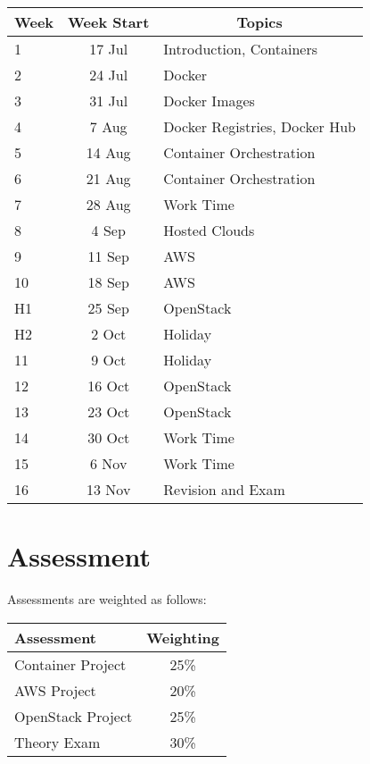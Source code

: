 \documentclass{article}
\begin{document}
\renewcommand{\arraystretch}{1.5}
\begin{tabular}{|l|c|l|}
\hline
 Week & Week Start & \multicolumn{1}{c|}{Topics}             \\ \hline
 1    & 17 Jul     & Introduction, Containers                 \\ \hline
 2    & 24 Jul     & Docker                                   \\ \hline
 3    &  31 Jul     & Docker Images                            \\ \hline
 4    & 7 Aug     & Docker Registries, Docker Hub            \\ \hline
 5    & 14 Aug     & Container Orchestration                  \\ \hline
 6    & 21 Aug     & Container Orchestration                 \\ \hline
 7    & 28 Aug     & Work Time                               \\ \hline
 8    &  4 Sep     & Hosted Clouds                            \\ \hline
 9    & 11 Sep     & AWS                                      \\ \hline
 10   & 18 Sep     & AWS                                      \\ \hline
 H1   & 25 Sep     & OpenStack                                  \\ \hline
 H2   &  2 Oct     & Holiday                                  \\ \hline
 11   & 9 Oct     & Holiday                               \\ \hline
 12   & 16 Oct     & OpenStack                                \\ \hline
 13   & 23 Oct     & OpenStack                               \\ \hline
 14   &  30 Oct     & Work Time                               \\ \hline
 15   &  6 Nov     & Work Time                               \\ \hline
 16   & 13 Nov     & Revision and Exam                       \\ \hline
\end{tabular}

\section*{Assessment}

Assessments are weighted as follows: \\
\begin{tabular}{|l|c|}
\hline
Assessment                  &  Weighting \\ \hline
Container Project           &  25\% \\ \hline
AWS Project                 &  20\% \\ \hline
OpenStack Project           &  25\% \\ \hline
Theory Exam                 &  30\% \\ \hline
\end{tabular}
\end{document}
